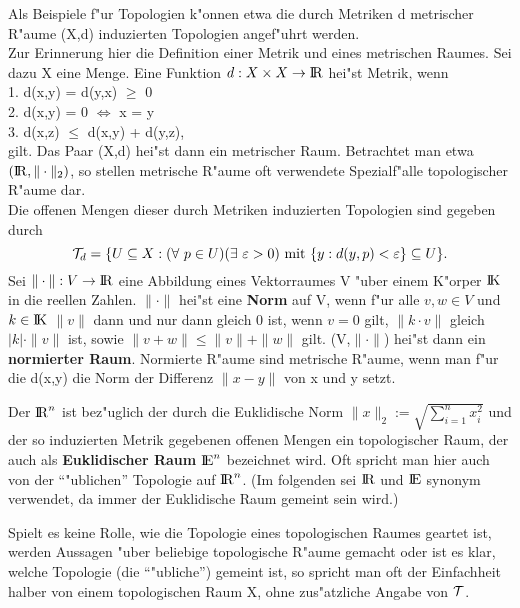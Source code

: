 Als Beispiele f"ur Topologien k"onnen etwa die durch Metriken
d metrischer R"aume (X,d) induzierten Topologien angef"uhrt werden.\\
{\scsi
Zur Erinnerung hier die Definition einer Metrik und eines metrischen Raumes.
Sei dazu X eine Menge. Eine Funktion $d:X\times X\to\mbox{$\rm I\!R$}$ hei"st Metrik, wenn\\
1. d(x,y) = d(y,x) $\geq$ 0\\
2. d(x,y) = 0 $\iff$ x = y\\
3. d(x,z) $\leq$ d(x,y) + d(y,z),\\
gilt. Das Paar (X,d) hei"st dann ein metrischer Raum. Betrachtet man etwa
$(\mbox{$\rm I\!R$},\|\cdot\|_2)$, so stellen metrische R"aume oft verwendete Spezialf"alle
topologischer R"aume dar.
}\\
Die offenen Mengen dieser durch Metriken induzierten Topologien sind gegeben
durch
$${\cal T}_d=\{U\subseteq X:(\forall~p\in U) (\exists~\varepsilon > 0)
\mbox{ mit } \{y:d(y,p)<\varepsilon\}\subseteq U\}.$$
Sei $\|\cdot\|:V\to\mbox{$\rm I\!R$}$ eine Abbildung eines Vektorraumes V "uber einem K"orper
$\mbox{$\rm I\!K$}$ in die reellen Zahlen. $\|\cdot\|$ hei"st eine {\bf Norm} auf V,
wenn f"ur alle $v,w\in V$ und $k\in\mbox{$\rm I\!K$}$ $\|v\|$ dann und nur dann gleich 0 ist,
wenn $v=0$ gilt, $\|k\cdot v\|$ gleich $|k|\cdot\|v\|$ ist, sowie $\|v+w\|\leq
\|v\|+\|w\|$ gilt. (V,$\|\cdot\|$) hei"st dann ein {\bf normierter Raum}.
 Normierte R"aume sind metrische R"aume, wenn man f"ur
die d(x,y) die Norm der Differenz $\|x-y\|$ von x und y setzt.

Der $\mbox{$\rm I\!R$}^n$ ist bez"uglich der durch die Euklidische Norm $\|x\|_2 :=
\sqrt{\sum_{i=1}^n x_i^2}$ und der so induzierten Metrik gegebenen
offenen Mengen ein topologischer Raum, der auch als {\bf Euklidischer Raum}
$\mbox{$\rm I\!E$}^n$ bezeichnet wird. Oft spricht man hier auch von der "`"ublichen"'
Topologie auf $\mbox{$\rm I\!R$}^n$. (Im folgenden sei $\mbox{$\rm I\!R$}$ und $\mbox{$\rm I\!E$}$ synonym verwendet, da immer
der Euklidische Raum gemeint sein wird.)

Spielt es keine Rolle, wie die Topologie eines topologischen Raumes
geartet ist, werden Aussagen "uber beliebige topologische R"aume gemacht
oder ist es klar, welche Topologie (die "`"ubliche"') gemeint ist, so spricht
man oft der Einfachheit halber von einem topologischen Raum X, ohne
zus"atzliche Angabe von ${\cal T}$.

